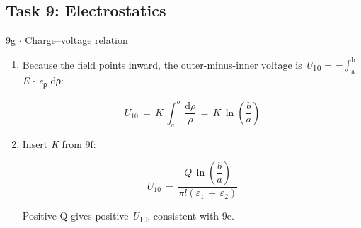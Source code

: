 \documentclass[11pt]{article}
\begin{document}
\begin{keepsection}\subsection{Task 9: Electrostatics}

\begin{workedbox}{9g \ensuremath{\cdot} Charge–voltage relation}
\begin{enumerate}
\item {}
Because the field points inward, the outer-minus-inner voltage is \textit{U}\textsubscript{10} = \ensuremath{-}$\int_{\mathrm{a}}^{\mathrm{b}} $ \textit{E} \ensuremath{\cdot} \textit{e}\textsubscript{ρ} d\textit{ρ}:

\begin{equation*}{U}_{10}\, =\, {K}\, \int_{{a}}^{{b}} \, \dfrac{\mathrm{d}ρ}{ρ}\, =\, {K}\, \ln \left(\dfrac{{b}}{{a}}\right)\end{equation*}
\item {}
Insert \textit{K} from 9f:

\begin{equation*}{U}_{10}\, =\, \dfrac{{Q}\, \ln \left(\dfrac{{b}}{{a}}\right)}{π{l}(ε_{1}\, +\, ε_{2})}\end{equation*}

Positive Q gives positive \textit{U}\textsubscript{10}, consistent with 9e.
\end{enumerate}
\end{workedbox}

\end{keepsection}
\end{document}

